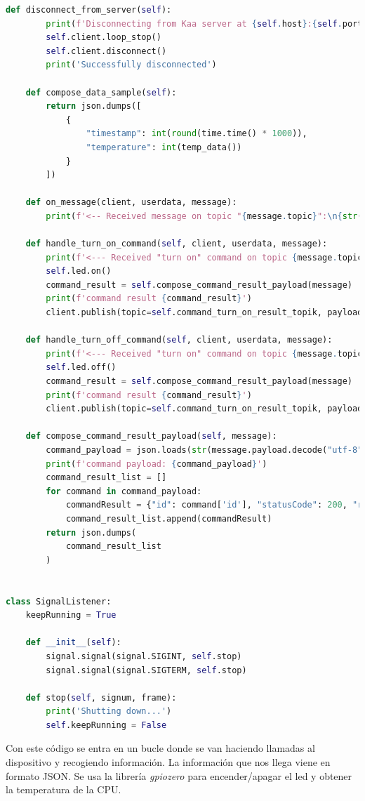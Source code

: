\begin{lstlisting}[language=Python]
    def disconnect_from_server(self):
        print(f'Disconnecting from Kaa server at {self.host}:{self.port}...')
        self.client.loop_stop()
        self.client.disconnect()
        print('Successfully disconnected')

    def compose_data_sample(self):
        return json.dumps([
            {
                "timestamp": int(round(time.time() * 1000)),
                "temperature": int(temp_data())
            }
        ])

    def on_message(client, userdata, message):
        print(f'<-- Received message on topic "{message.topic}":\n{str(message.payload.decode("utf-8"))}')

    def handle_turn_on_command(self, client, userdata, message):
        print(f'<--- Received "turn on" command on topic {message.topic} \nTurning on...')
        self.led.on()
        command_result = self.compose_command_result_payload(message)
        print(f'command result {command_result}')
        client.publish(topic=self.command_turn_on_result_topik, payload=command_result)

    def handle_turn_off_command(self, client, userdata, message):
        print(f'<--- Received "turn on" command on topic {message.topic} \nTurning off...')
        self.led.off()
        command_result = self.compose_command_result_payload(message)
        print(f'command result {command_result}')
        client.publish(topic=self.command_turn_on_result_topik, payload=command_result)

    def compose_command_result_payload(self, message):
        command_payload = json.loads(str(message.payload.decode("utf-8")))
        print(f'command payload: {command_payload}')
        command_result_list = []
        for command in command_payload:
            commandResult = {"id": command['id'], "statusCode": 200, "reasonPhrase": "OK", "payload": "Success"}
            command_result_list.append(commandResult)
        return json.dumps(
            command_result_list
        )


class SignalListener:
    keepRunning = True

    def __init__(self):
        signal.signal(signal.SIGINT, self.stop)
        signal.signal(signal.SIGTERM, self.stop)

    def stop(self, signum, frame):
        print('Shutting down...')
        self.keepRunning = False

\end{lstlisting}

Con este código se entra en un bucle donde se van haciendo llamadas al dispositivo y recogiendo información. La información que nos llega viene en formato JSON. Se usa la librería \textit{gpiozero} para encender/apagar el led y obtener la temperatura de la CPU. \\

